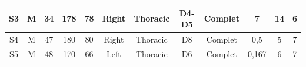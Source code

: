 \begin{landscape}
\begin{table}[h]
\begin{tabular}{|c|c|c|c|c|c|c|c|c|c|c|c|}
S3                                                     & M                                   & 34                                & 178                                       & 78                                        & Right                                                                                    & Thoracic                                                                                 & D4-D5                                                                                      & Complet                                                                                     & 7                                                                                               & 14                                                                                         & 6                                                                                          \\ \hline
S4                                                     & M                                   & 47                                & 180                                       & 80                                        & Right                                                                                    & Thoracic                                                                                 & D8                                                                                         & Complet                                                                                     & 0,5                                                                                             & 5                                                                                          & 7                                                                                          \\ \hline
S5                                                     & M                                   & 48                                & 170                                       & 66                                        & Left                                                                                     & Thoracic                                                                                 & D6                                                                                         & Complet                                                                                     & 0,167                                                                                           & 6                                                                                          & 7                                                                                          \\ \hline

\end{tabular}
\end{table}
\end{landscape}
